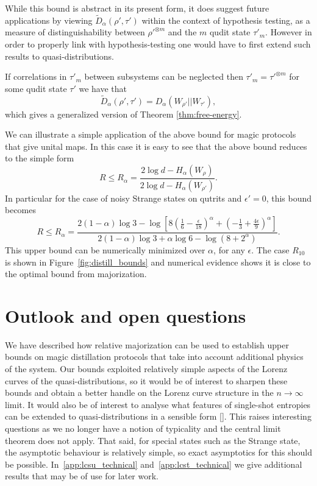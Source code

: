 \documentclass[pra,
aps,
twocolumn,
superscriptaddress,
groupedaddress,
nofootinbib,
reprint
]{revtex4-1}
\begin{document}
While this bound is abstract in its present form, it does suggest future applications by viewing $\tilde{D}_\alpha( \rho', \tau')$ within the context of hypothesis testing, as a measure of distinguishability between $\rho'^{\otimes m}$ and the $m$ qudit state $\tau'_m$. 
However in order to properly link with hypothesis-testing one would have to first extend such results to quasi-distributions.

If correlations in $\tau'_m$ between subsystems can be neglected then $\tau'_m = \tau'^{\otimes m}$ for some qudit state $\tau'$ we have that
\begin{equation}
\tilde{D}_\alpha( \rho', \tau') = D_\alpha (W_{\rho'} || W_{\tau'}),
\end{equation}
which gives a generalized version of Theorem \ref{thm:free-energy}.

We can illustrate a simple application of the above bound for magic protocols that give unital maps. In this case it is easy to see that the above bound reduces to the simple form
\begin{equation}
	R \leq R_\alpha=\frac{2\log d - H_{\alpha}(W_\rho)}{2\log d - H_{\alpha}(W_{\rho'})}.
\end{equation}
In particular for the case of noisy Strange states on qutrits and $\epsilon'=0$, this bound becomes
\begin{equation}
	R \leq R_\alpha=\frac{2(1-\alpha)\log 3 - \log \left [8(\frac{1}{6} - \frac{\epsilon}{18})^\alpha + (-\frac{1}{3} + \frac{4\epsilon}{9})^\alpha\right ] }{2(1-\alpha)\log 3 + \alpha \log 6 - \log (8 + 2^\alpha )}.
\end{equation}
This upper bound can be numerically minimized over $\alpha$, for any $\epsilon$. The case $R_{10}$ is shown in Figure~\ref{fig:distill_bounds} and numerical evidence shows it is close to the optimal bound from majorization.

\section{Outlook and open questions}
\label{sec:lower_bounds}

We have described how relative majorization can be used to establish upper bounds on magic distillation protocols that take into account additional physics of the system. Our bounds exploited relatively simple aspects of the Lorenz curves of the quasi-distributions, so it would be of interest to sharpen these bounds and obtain a better handle on the Lorenz curve structure in the $n\rightarrow \infty$ limit. It would also be of interest to analyse what features of single-shot entropies can be extended to quasi-distributions in a sensible form []. This raises interesting questions as we no longer have a notion of typicality and the central limit theorem does not apply. That said, for special states such as the Strange state, the asymptotic behaviour is relatively simple, so exact asymptotics for this should be possible. In~\cref{app:lcsu_technical} and~\cref{app:lcst_technical} we give additional results that may be of use for later work.
\end{document}
